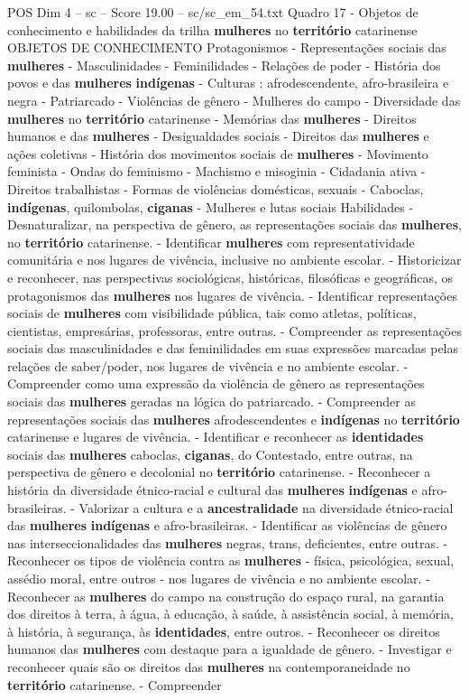 \begin{textsample}{POS Dim 4 – sc – Score 19.00 – sc/sc\_em\_54.txt}
Quadro 17 - Objetos de conhecimento e habilidades da trilha \textbf{mulheres} no \textbf{território} catarinense OBJETOS DE CONHECIMENTO Protagonismos - Representações sociais das \textbf{mulheres} - Masculinidades - Feminilidades - Relações de poder - História dos povos e das \textbf{mulheres} \textbf{indígenas} - Culturas : afrodescendente, afro-brasileira e negra - Patriarcado - Violências de gênero - Mulheres do campo - Diversidade das \textbf{mulheres} no \textbf{território} catarinense - Memórias das \textbf{mulheres} - Direitos humanos e das \textbf{mulheres} - Desigualdades sociais - Direitos das \textbf{mulheres} e ações coletivas - História dos movimentos sociais de \textbf{mulheres} - Movimento feminista - Ondas do feminismo - Machismo e misoginia - Cidadania ativa - Direitos trabalhistas - Formas de violências domésticas, sexuais - Caboclas, \textbf{indígenas}, quilombolas, \textbf{ciganas} - Mulheres e lutas sociais Habilidades - Desnaturalizar, na perspectiva de gênero, as representações sociais das \textbf{mulheres}, no \textbf{território} catarinense. - Identificar \textbf{mulheres} com representatividade comunitária e nos lugares de vivência, inclusive no ambiente escolar. - Historicizar e reconhecer, nas perspectivas sociológicas, históricas, filosóficas e geográficas, os protagonismos das \textbf{mulheres} nos lugares de vivência. - Identificar representações sociais de \textbf{mulheres} com visibilidade pública, tais como atletas, políticas, cientistas, empresárias, professoras, entre outras. - Compreender as representações sociais das masculinidades e das feminilidades em suas expressões marcadas pelas relações de saber/poder, nos lugares de vivência e no ambiente escolar. - Compreender como uma expressão da violência de gênero as representações sociais das \textbf{mulheres} geradas na lógica do patriarcado. - Compreender as representações sociais das \textbf{mulheres} afrodescendentes e \textbf{indígenas} no \textbf{território} catarinense e lugares de vivência. - Identificar e reconhecer as \textbf{identidades} sociais das \textbf{mulheres} caboclas, \textbf{ciganas}, do Contestado, entre outras, na perspectiva de gênero e decolonial no \textbf{território} catarinense. - Reconhecer a história da diversidade étnico-racial e cultural das \textbf{mulheres} \textbf{indígenas} e afro-brasileiras. - Valorizar a cultura e a \textbf{ancestralidade} na diversidade étnico-racial das \textbf{mulheres} \textbf{indígenas} e afro-brasileiras. - Identificar as violências de gênero nas interseccionalidades das \textbf{mulheres} negras, trans, deficientes, entre outras. - Reconhecer os tipos de violência contra as \textbf{mulheres} - física, psicológica, sexual, assédio moral, entre outros - nos lugares de vivência e no ambiente escolar. - Reconhecer as \textbf{mulheres} do campo na construção do espaço rural, na garantia dos direitos à terra, à água, à educação, à saúde, à assistência social, à memória, à história, à segurança, às \textbf{identidades}, entre outros. - Reconhecer os direitos humanos das \textbf{mulheres} com destaque para a igualdade de gênero. - Investigar e reconhecer quais são os direitos das \textbf{mulheres} na contemporaneidade no \textbf{território} catarinense. - Compreender 
\end{textsample}
